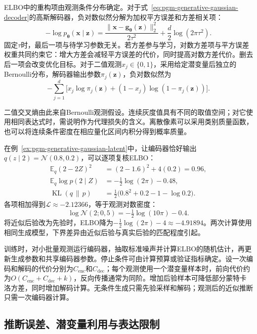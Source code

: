 ELBO中的重构项由观测条件分布确定。对于式~\eqref{eq:pgm-generative-gaussian-decoder}的高斯解码器，负对数似然分解为加权平方误差和方差相关项：
\begin{equation}
  \label{eq:pgm-generative-reconstruction}
  -\log p_{\bm{\theta}}(\bm{x}\mid\bm{z})
  =\frac{\lVert\bm{x}-\bm{g}_{\bm{\theta}}(\bm{z})\rVert_2^2}
          {2\tau^2}
    +\frac{d}{2}\log(2\pi\tau^2).
\end{equation}
固定$\tau$时，最后一项与待学习参数无关。若方差参与学习，对数方差项与平方误差权重共同约束它：增大方差会减轻平方误差的代价，同时提高对数方差代价。删去后一项会改变优化目标。对于二值观测$x_j\in\{0,1\}$，采用给定潜变量后独立的Bernoulli分布，解码器输出参数$\pi_j(\bm{z})$，负对数似然为
\[
  -\sum_{j=1}^{d}
    \bigl[x_j\log\pi_j(\bm{z})
      +(1-x_j)\log(1-\pi_j(\bm{z}))\bigr].
\]

二值交叉熵由此来自Bernoulli观测假设。连续灰度值具有不同的取值空间；对它使用相同表达式时，需说明作为代理损失的含义。离散像素可以采用类别质量函数，也可以将连续条件密度在相应量化区间内积分得到概率质量。

在例~\ref{ex:pgm-generative-gaussian-latent}中，让编码器恰好输出$q(z\mid2)=\mathcal{N}(0.8,0.2)$，可以逐项复核ELBO：
\[
  \begin{aligned}
    \mathbb{E}_{q}(2-2Z)^2&=(2-1.6)^2+4(0.2)=0.96,\\
    \mathbb{E}_{q}\log p(2\mid Z)&=-\tfrac12\log(2\pi)-0.48,\\
    \operatorname{KL}(q\,\|\,p)&=
       \tfrac12\bigl(0.8^2+0.2-1-\log0.2\bigr).
  \end{aligned}
\]
各项相加得到$\mathcal{L}\approx-2.12366$，等于观测对数密度：
\[
  \log\mathcal{N}(2;0,5)
  =-\tfrac12\log(10\pi)-0.4.
\]
将近似后验改为先验时，ELBO降为$-\tfrac12\log(2\pi)-4\approx-4.91894$。两次计算使用相同生成模型，下界差异由近似后验与真实后验的匹配程度引起。

训练时，对小批量观测运行编码器，抽取标准噪声并计算ELBO的随机估计，再更新生成参数和共享编码器参数。停止条件可由计算预算或验证指标确定。设一次编码和解码的代价分别为$C_{\mathrm{enc}}$和$C_{\mathrm{dec}}$；每个观测使用一个潜变量样本时，前向代价约为$O(C_{\mathrm{enc}}+C_{\mathrm{dec}}+k)$，反向传播通常为同阶。增加后验样本可降低部分蒙特卡洛方差，同时增加解码计算。无条件生成只需先验采样和解码；观测后的近似推断只需一次编码器计算。

\subsection{推断误差、潜变量利用与表达限制}
\label{sec:pgm-generative-vae-failure}

